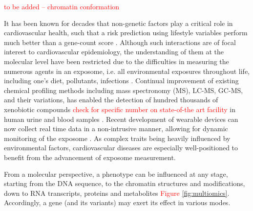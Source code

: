 \documentclass[letter]{bioinfo}
\newcommand{\comment}[1]{\textcolor{red}{#1}}
\begin{document}



\comment{to be added -- chromatin conformation \citep{Rosa-Garrido:2017:HighResolution}}


It has been known for decades that non-genetic factors play a critical role in cardiovascular health, such that a risk prediction using lifestyle variables perform much better than a gene-count score \citep{Joyner:2011:Ten}. Although such interactions are of focal interest to cardiovascular epidemiology,  the understanding of them at the molecular level have been restricted due to the difficulties in measuring the numerous agents in an exposome, i.e. all environmental exposures throughout life, including one's diet, pollutants, infections \citep{Wild:2005:Complementing}. Continual improvement of existing chemical profiling methods including mass spectronomy (MS), LC-MS, GC-MS, and their variations, has enabled the detection of hundred thousands of xenobiotic compounds \comment{check for specific number on state-of-the art facility} in human urine and blood samples \citep{Warth:2017:ExposomeScale}.
Recent development of wearable devices can now collect real time data in a non-intrusive manner, allowing for dynamic monitoring of the exposome \citep{Jiang:2018:Dynamic}. As complex traits being heavily influenced by environmental factors, cardiovascular diseases are especially well-positioned to benefit from the advancement of exposome measurement.



From a molecular perspective, a phenotype can be influenced at any stage, starting from the DNA sequence, to the chromatin structures and modifications, down to RNA transcripts, proteins and metabolites \comment{Figure \ref{fig:multiomics}}. Accordingly, a gene (and its variants) may exert its effect in various modes.
\end{document}
